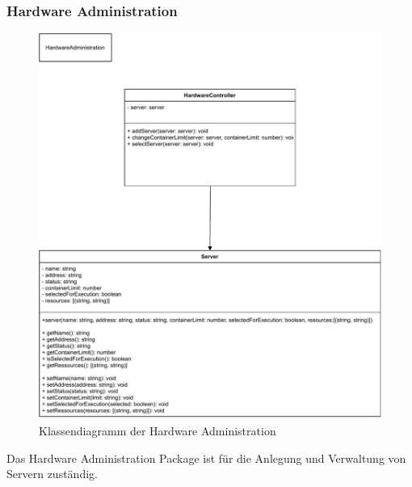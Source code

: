 \subsubsection{Hardware Administration}
\begin{figure}[h!]
    \includegraphics[width=1\textwidth]{res/HardwareAdministration.pdf}
    \caption{Klassendiagramm der Hardware Administration}
\end{figure}
\FloatBarrier
Das Hardware Administration Package ist für die Anlegung und Verwaltung von Servern zuständig.

\FloatBarrier
\newpage

